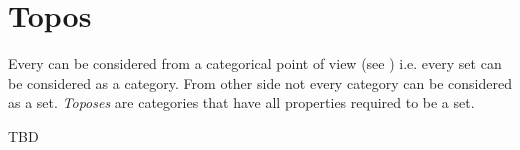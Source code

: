 \chapter{Topos}
\label{sec:topos}
Every  can be considered from a categorical point of
view (see ) i.e. every set can be
considered as a category. From other side not every category can be
considered as a set. \textit{Toposes} are categories that have all
properties required to be a set. 

TBD
